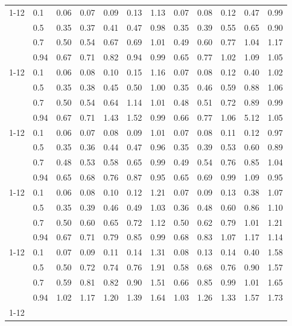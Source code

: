\begin{table}
{\begin{tabular}{llrrrrrrrrrr}
\cmidrule{1-12}
\multirow[t]{4}{*}{systemd containment removed} & 0.1 & 0.06 & 0.07 & 0.09 & 0.13 & 1.13 & 0.07 & 0.08 & 0.12 & 0.47 & 0.99 \\
 & 0.5 & 0.35 & 0.37 & 0.41 & 0.47 & 0.98 & 0.35 & 0.39 & 0.55 & 0.65 & 0.90 \\
 & 0.7 & 0.50 & 0.54 & 0.67 & 0.69 & 1.01 & 0.49 & 0.60 & 0.77 & 1.04 & 1.17 \\
 & 0.94 & 0.67 & 0.71 & 0.82 & 0.94 & 0.99 & 0.65 & 0.77 & 1.02 & 1.09 & 1.05 \\
\cmidrule{1-12}
\multirow[t]{4}{*}{IRQ steering removed} & 0.1 & 0.06 & 0.08 & 0.10 & 0.15 & 1.16 & 0.07 & 0.08 & 0.12 & 0.40 & 1.02 \\
 & 0.5 & 0.35 & 0.38 & 0.45 & 0.50 & 1.00 & 0.35 & 0.46 & 0.59 & 0.88 & 1.06 \\
 & 0.7 & 0.50 & 0.54 & 0.64 & 1.14 & 1.01 & 0.48 & 0.51 & 0.72 & 0.89 & 0.99 \\
 & 0.94 & 0.67 & 0.71 & 1.43 & 1.52 & 0.99 & 0.66 & 0.77 & 1.06 & 5.12 & 1.05 \\
\cmidrule{1-12}
\multirow[t]{4}{*}{boot-params bundle removed} & 0.1 & 0.06 & 0.07 & 0.08 & 0.09 & 1.01 & 0.07 & 0.08 & 0.11 & 0.12 & 0.97 \\
 & 0.5 & 0.35 & 0.36 & 0.44 & 0.47 & 0.96 & 0.35 & 0.39 & 0.53 & 0.60 & 0.89 \\
 & 0.7 & 0.48 & 0.53 & 0.58 & 0.65 & 0.99 & 0.49 & 0.54 & 0.76 & 0.85 & 1.04 \\
 & 0.94 & 0.65 & 0.68 & 0.76 & 0.87 & 0.95 & 0.65 & 0.69 & 0.99 & 1.09 & 0.95 \\
\cmidrule{1-12}
\multirow[t]{4}{*}{frequency pinning removed} & 0.1 & 0.06 & 0.08 & 0.10 & 0.12 & 1.21 & 0.07 & 0.09 & 0.13 & 0.38 & 1.07 \\
 & 0.5 & 0.35 & 0.39 & 0.46 & 0.49 & 1.03 & 0.36 & 0.48 & 0.60 & 0.86 & 1.10 \\
 & 0.7 & 0.50 & 0.60 & 0.65 & 0.72 & 1.12 & 0.50 & 0.62 & 0.79 & 1.01 & 1.21 \\
 & 0.94 & 0.67 & 0.71 & 0.79 & 0.85 & 0.99 & 0.68 & 0.83 & 1.07 & 1.17 & 1.14 \\
\cmidrule{1-12}
\multirow[t]{4}{*}{SMT enabled (multi-core)} & 0.1 & 0.07 & 0.09 & 0.11 & 0.14 & 1.31 & 0.08 & 0.13 & 0.14 & 0.40 & 1.58 \\
 & 0.5 & 0.50 & 0.72 & 0.74 & 0.76 & 1.91 & 0.58 & 0.68 & 0.76 & 0.90 & 1.57 \\
 & 0.7 & 0.59 & 0.81 & 0.82 & 0.90 & 1.51 & 0.66 & 0.85 & 0.99 & 1.01 & 1.65 \\
 & 0.94 & 1.02 & 1.17 & 1.20 & 1.39 & 1.64 & 1.03 & 1.26 & 1.33 & 1.57 & 1.73 \\
\cmidrule{1-12}
\bottomrule
\end{tabular}%
}
\end{table}
